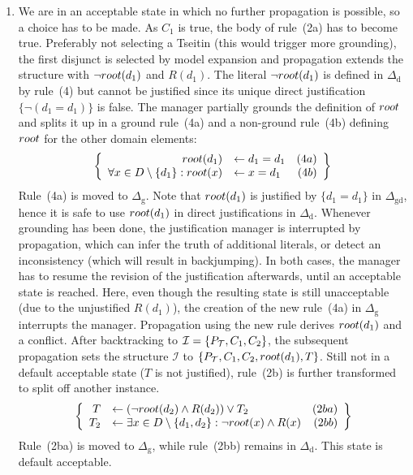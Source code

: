 \documentclass[11pt]{article}
\newcommand{\m}[1]{\ensuremath{#1}\xspace}
\newcommand{\lrule}{\m{\leftarrow}}
\newcommand{\I}{\m{\mathcal{I}}}
\newcommand{\theory}{\m{\mathcal{T}}}
\newcommand{\D}{\m{\Delta}}
\newcommand{\typed}[2]{\m{#1\in #2:}}
\theoremstyle{plain}
\theoremstyle{definition}
\theoremstyle{example_basic}
\theoremstyle{example_contd}
\theoremstyle{plain}
\newcommand{\Dg}{\ensuremath{\D_\text{g}}\xspace}
\newcommand{\Dd}{\ensuremath{\D_\text{d}}\xspace}
\newcommand{\Dgd}{\ensuremath{\D_\text{gd}}\xspace}
\newcommand{\pt}{\ensuremath{P_\text{\theory}}\xspace}
\newcommand{\change}[1]{#1}
\begin{document}
\begin{enumerate}
\item We are in an acceptable state in which no further propagation is possible, so a choice has to be made. As $C_1$ is true, the body of rule~(2a) has to become true. Preferably not selecting a Tseitin (this would trigger more grounding), the first disjunct is selected by model expansion and propagation extends the structure with $\neg root(d_1)$ and $R(d_1)$. \change{The literal $\neg root(d_1)$ is defined in \Dd by rule~(4) but cannot be justified since its unique direct justification $\{\neg (d_1=d_1)\}$ is false. The manager partially grounds the definition of $root$ and splits it up in a ground rule~(4a) and a non-ground  rule~(4b) defining $root$ for the other domain elements: }
  \[\begin{array}{c}
    \left\{\begin{array}{rlr}
        \rt(d_1)& \lrule \change{d_1=d_1} & (4a)\\
        \forall \typed{x}{D\setminus \{d_1\}} \rtx(x) &\lrule x=d_1 & (4b)
      \end{array}\right\}
  \end{array}\]
  Rule~(4a) is moved to \Dg. \change{Note that $root(d_1)$ is justified by $\{d_1=d_1\}$ in \Dgd,} hence it is safe to use $root(d_1)$ in direct justifications in \Dd. \change{Whenever grounding has been done, the justification manager is interrupted by propagation, which can infer the truth of additional literals, or detect an inconsistency (which will result in backjumping). In both cases, the manager has to resume the revision of the justification afterwards, until an acceptable state is reached. Here, even though the resulting state is still unacceptable (due to the unjustified $R(d_1)$), the creation of the new rule~(4a) in \Dg interrupts the manager. Propagation using the new rule derives $root(d_1)$ and a conflict.  After backtracking to $\I=\{ \pt, C_1, C_2\}$, the subsequent propagation sets the structure \I to $\{ \pt, C_1, C_2, \rt(d_1), T\}$. Still not in a default acceptable state ($T$ is not justified), rule~(2b) is further transformed to split off another instance.}
 \[\begin{array}{c}
   \left\{\begin{array}{rlr}
       T & \lrule (\lnot \rt(d_2) \land R(d_2)) \lor T_2 & (2ba) \\
       T_2 & \lrule \exists \typed{x }{D\setminus\{d_1,d_2\}} \lnot\rt(x)\land R(x) & (2bb)
     \end{array}\right\}
 \end{array}\]
 Rule~(2ba) is moved to $\Dg$, while rule~(2bb) remains in \Dd. This state is default acceptable.


\end{enumerate}
\end{document}
